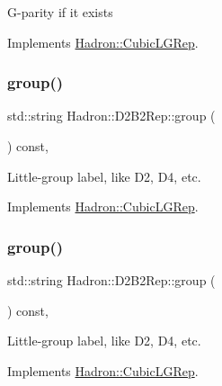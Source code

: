 G-\/parity if it exists 

Implements \mbox{\hyperlink{structHadron_1_1CubicLGRep_ace26f7b2d55e3a668a14cb9026da5231}{Hadron\+::\+Cubic\+L\+G\+Rep}}.

\mbox{\label{structHadron_1_1D2B2Rep_a9fb4cee66698b4d18b47ed2f4aa9ff2f}} 
\subsubsection{\texorpdfstring{group()}{group()}\hspace{0.1cm}{\footnotesize\ttfamily [1/5]}}
{\footnotesize\ttfamily std\+::string Hadron\+::\+D2\+B2\+Rep\+::group (\begin{DoxyParamCaption}{ }\end{DoxyParamCaption}) const\hspace{0.3cm}{\ttfamily [inline]}, {\ttfamily [virtual]}}

Little-\/group label, like D2, D4, etc. 

Implements \mbox{\hyperlink{structHadron_1_1CubicLGRep_a9bdb14b519a611d21379ed96a3a9eb41}{Hadron\+::\+Cubic\+L\+G\+Rep}}.

\mbox{\label{structHadron_1_1D2B2Rep_a9fb4cee66698b4d18b47ed2f4aa9ff2f}} 
\subsubsection{\texorpdfstring{group()}{group()}\hspace{0.1cm}{\footnotesize\ttfamily [2/5]}}
{\footnotesize\ttfamily std\+::string Hadron\+::\+D2\+B2\+Rep\+::group (\begin{DoxyParamCaption}{ }\end{DoxyParamCaption}) const\hspace{0.3cm}{\ttfamily [inline]}, {\ttfamily [virtual]}}

Little-\/group label, like D2, D4, etc. 

Implements \mbox{\hyperlink{structHadron_1_1CubicLGRep_a9bdb14b519a611d21379ed96a3a9eb41}{Hadron\+::\+Cubic\+L\+G\+Rep}}.

\mbox{\label{structHadron_1_1D2B2Rep_a9fb4cee66698b4d18b47ed2f4aa9ff2f}} 
